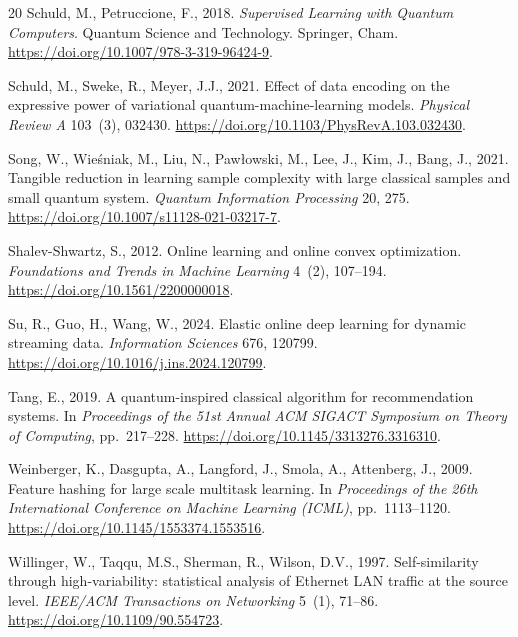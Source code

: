 \documentclass[preprint,12pt,authoryear]{elsarticle}
\begin{document}
\begin{thebibliography}{20}
Schuld, M., Petruccione, F., 2018.
\newblock \emph{Supervised Learning with Quantum Computers}.
\newblock Quantum Science and Technology. Springer, Cham.
\newblock \url{https://doi.org/10.1007/978-3-319-96424-9}.

Schuld, M., Sweke, R., Meyer, J.J., 2021.
\newblock Effect of data encoding on the expressive power of variational quantum-machine-learning models.
\newblock \emph{Physical Review A} 103~(3), 032430.
\newblock \url{https://doi.org/10.1103/PhysRevA.103.032430}.

Song, W., Wie\'sniak, M., Liu, N., Paw\l{}owski, M., Lee, J., Kim, J., Bang, J., 2021.
\newblock Tangible reduction in learning sample complexity with large classical samples and small quantum system.
\newblock \emph{Quantum Information Processing} 20, 275.
\newblock \url{https://doi.org/10.1007/s11128-021-03217-7}.

Shalev-Shwartz, S., 2012.
\newblock Online learning and online convex optimization.
\newblock \emph{Foundations and Trends in Machine Learning} 4~(2), 107--194.
\newblock \url{https://doi.org/10.1561/2200000018}.

Su, R., Guo, H., Wang, W., 2024.
\newblock Elastic online deep learning for dynamic streaming data.
\newblock \emph{Information Sciences} 676, 120799.
\newblock \url{https://doi.org/10.1016/j.ins.2024.120799}.

Tang, E., 2019.
\newblock A quantum-inspired classical algorithm for recommendation systems.
\newblock In \emph{Proceedings of the 51st Annual ACM SIGACT Symposium on Theory of Computing}, pp.~217--228.
\newblock \url{https://doi.org/10.1145/3313276.3316310}.

Weinberger, K., Dasgupta, A., Langford, J., Smola, A., Attenberg, J., 2009.
\newblock Feature hashing for large scale multitask learning.
\newblock In \emph{Proceedings of the 26th International Conference on Machine Learning (ICML)}, pp.~1113--1120.
\newblock \url{https://doi.org/10.1145/1553374.1553516}.

Willinger, W., Taqqu, M.S., Sherman, R., Wilson, D.V., 1997.
\newblock Self-similarity through high-variability: statistical analysis of Ethernet LAN traffic at the source level.
\newblock \emph{IEEE/ACM Transactions on Networking} 5~(1), 71--86.
\newblock \url{https://doi.org/10.1109/90.554723}.


\end{thebibliography}
\end{document}
